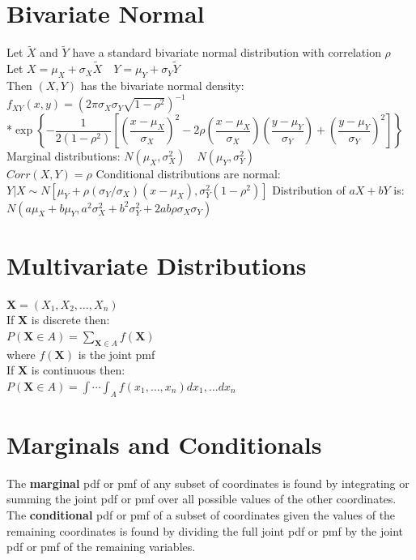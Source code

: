 \documentclass[openany]{book}
\begin{document}
\begin{flushleft}
\section{Bivariate Normal}
Let $\tilde{X}$ and $\tilde{Y}$ have a standard bivariate normal distribution with correlation $\rho$\\
Let $X=\mu_X+\sigma_X\tilde{X} \quad Y=\mu_Y+\sigma_Y\tilde{Y}$\\
Then $(X,Y)$ has the bivariate normal density:\\
$f_{XY}(x,y)=\left(2\pi \sigma_X \sigma_Y \sqrt{1-\rho^2} \right)^{-1}$\\
*$\exp{\left\{-\dfrac{1}{2(1-\rho^2)}\left[\left(\dfrac{x-\mu_X}{\sigma_X} \right)^2- 2\rho \left(\dfrac{x-\mu_X}{\sigma_X} \right)\left(\dfrac{y-\mu_Y}{\sigma_Y} \right)+\left(\dfrac{y-\mu_Y}{\sigma_Y} \right)^2 \right] \right\}}$\medbreak
Marginal distributions: $N(\mu_X,\sigma^2_X) \quad N(\mu_Y,\sigma^2_Y)$\\
$Corr(X,Y)=\rho$\medbreak
Conditional distributions are normal:\\
$Y|X \sim N[\mu_Y+\rho(\sigma_Y/\sigma_X)(x-\mu_X),\sigma^2_Y(1-\rho^2)]$\medbreak
Distribution of $aX+bY$ is:\\
$N(a\mu_X+b\mu_Y,a^2\sigma^2_X+b^2\sigma^2_Y+2ab\rho \sigma_X \sigma_Y)$
\section{Multivariate Distributions}
$\boldsymbol{X}=(X_1,X_2,\dots, X_n)$\\
If $\boldsymbol{X}$ is discrete then:\\
$P(\boldsymbol{X} \in A)=\sum_{\boldsymbol{X} \in A} f(\boldsymbol{X})$\\
where $f(\boldsymbol{X})$ is the joint pmf\\
If $\boldsymbol{X}$ is continuous then:\\
$P(\boldsymbol{X}\in A)=\int \cdots \int_{A}f(x_1,\dots,x_n)dx_1,\dots dx_n$\medbreak
\section{Marginals and Conditionals}
The \textbf{marginal} pdf or pmf of any subset of coordinates is found by integrating or summing the joint pdf or pmf over all possible values of the other coordinates.\medbreak
The \textbf{conditional} pdf or pmf of a subset of coordinates given the values of the remaining coordinates is found by dividing the full joint pdf or pmf by the joint pdf or pmf of the remaining variables.

\end{flushleft}
\end{document}
